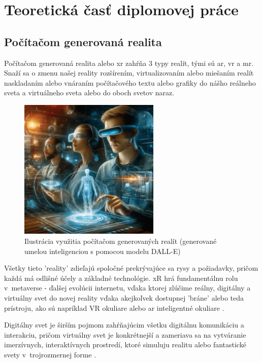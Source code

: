 \section{Teoretická časť diplomovej práce}

\subsection{Počítačom generovaná realita}

Počítačom generovaná realita alebo \gls{xr} zahŕňa 3 typy realít, tými sú \gls{ar}, \gls{vr} a \gls{mr}. Snaží sa o zmenu našej reality rozšírením, virtualizovaním alebo miešaním realít naskladaním alebo vnáraním počítačového textu alebo grafiky do nášho reálneho sveta a virtuálneho sveta alebo do oboch svetov naraz. 

\begin{figure}[h]
  \centering
  \includegraphics[width=0.6\textwidth]{img/Pocitacom_generovana_realita.png}
  \caption{Ilustrácia využitia počítačom generovaných realít (generované umelou inteligenciou s pomocou modelu DALL-E)}
  \label{fig:poc_gen_real}
\end{figure}

Všetky tieto 'reality' zdieľajú spoločné prekrývajúce sa rysy a požiadavky, pričom každá má odlišné účely a základné technológie. xR hrá fundamentálnu rolu v~metaverse - ďalšej evolúcii internetu, vďaka ktorej zlúčime reálny, digitálny a virtuálny svet do novej reality vďaka akejkoľvek dostupnej 'bráne' alebo teda prístroju, ako sú napríklad VR okuliare alebo \gls{ar} inteligentné okuliare \cite{armXR2022}.

Digitálny svet je širším pojmom zahŕňajúcim všetku digitálnu komunikáciu a interakciu, pričom virtuálny svet je konkrétnejší a zameriava sa na vytváranie imerzívnych, interaktívnych prostredí, ktoré simuluju realitu alebo fantastické svety v~trojrozmernej forme \cite{redkiwi2024digitalvirtual}.

